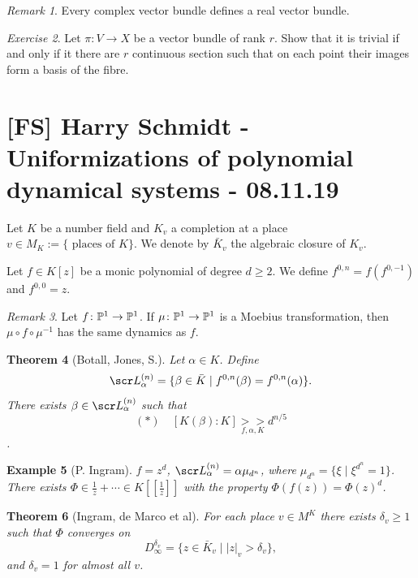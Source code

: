 \documentclass[A4paper, british]{amsart}
\theoremstyle{darkgreentheorem}
\newtheorem{thm}{Theorem}[section]
\theoremstyle{darkbluedefinition}
\theoremstyle{darkredexample}
\newtheorem{exa}[thm]{Example}
\theoremstyle{remark}
\newtheorem{rem}[thm]{Remark}
\newtheorem{exe}[thm]{Exercise}
\newcommand{\1}{\mathbbm{1}}
\begin{document}
\begin{rem}
    Every complex vector bundle defines a real vector bundle.
\end{rem}

\begin{exe}
    Let $\pi\colon V\to X$ be a vector bundle of rank $r$.
    Show that it is trivial if and only if it there are $r$ continuous section such that on each point their images form a basis of the fibre.
\end{exe}

\section{[FS] Harry Schmidt - Uniformizations of polynomial dynamical systems - 08.11.19}

Let $K$ be a number field and $K_{v}$ a completion at a place $v\in M_{K}:=\{ \text{ places of }K\}$.
We denote by $\bar{K}_{v}$ the algebraic closure of $K_{v}$.

Let $f\in K[z]$ be a monic polynomial of degree $d\geqslant 2$.
We define $f^{0,n}=f(f^{0,-1})$ and $f^{0,0}=z$.

\begin{rem}
    Let $f\colon \P^{1}\to \P^{1}$.
    If $\mu\colon \P^{1}\to \P^{1}$ is a Moebius transformation, then $\mu\circ f\circ \mu^{-1}$ has the same dynamics as $f$.
\end{rem}

\begin{thm}[Botall, Jones, S.]
    Let $\alpha\in K$.
    Define
    \[ \L_{\alpha}^{(n)}=\{ \beta\in \bar{K}\mid f^{0,n}(\beta)=f^{0,n}(\alpha)\}. \]
    There exists $\beta\in \L_{\alpha}^{(n)}$ such that
    \[ (*)\quad [K(\beta):K]\underset{f,\alpha,K}{>>}d^{n/5}\].
\end{thm}

\begin{exa}[P. Ingram]
    $f=z^{d}$, $\L_{\alpha}^{(n)}=\alpha\mu_{d^{n}}$, where $\mu_{d^{n}}=\{ \xi \mid \xi^{d^{n}}=1\}$.
    There exists $\Phi\in \frac{1}{z}+\cdots \in K[[\frac{1}{z}]]$ with the property $\Phi(f(z))=\Phi(z)^{d}$.
\end{exa}

\begin{thm}[Ingram, de Marco et al]
    For each place $v\in M^{K}$ there exists $\delta_{v}\geqslant 1$ such that $\Phi$ converges on
    \[ D_{\infty}^{\delta_{v}}=\{ z\in \bar{K}_{v}\mid |z|_{v}>\delta_{v}\},\]
    and $\delta_{v}=1$ for almost all $v$.
\end{thm}
\end{document}
